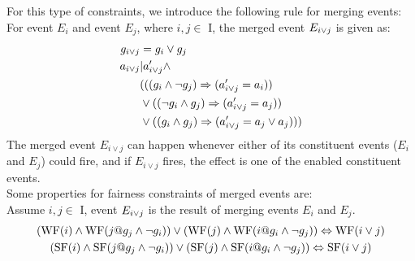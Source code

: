For this type of constraints, we introduce the following rule for
merging events: For event $E_{i}$ and event $E_{j}$, where $i,j \in$
I, the merged event $E_{i\vee j}$ is given as:
\begin{align*}
g_{i\vee {j}} & =  g_i\vee g_j\\
a_{i\vee {j}} & |  a'_{i\vee j} \wedge \\
           &    (((g_i\wedge\neg g_j)\Rightarrow (a'_{i\vee j} = a_i))\\
           &    \vee ((\neg g_i\wedge g_j)\Rightarrow (a'_{i\vee j} = a_j))\\
           &    \vee ((g_i\wedge g_j)\Rightarrow (a'_{i\vee j} = a_j\vee a_j)))
\end{align*}
The merged event $E_{i\lor{j}}$ can happen whenever either of its constituent events ($E_i$ and $E_j$) could fire, and if $E_{i\lor{j}}$ fires, the effect is one of the enabled constituent events.\\
Some properties for fairness constraints of merged events are:\\
Assume $i,j \in$ I, event $E_{i\vee j}$ is the result of merging events $E_i$ and $E_j$.
\begin{gather*} 
  (\mathrm{WF}(i)\wedge\mathrm{WF}(j@g_{j}\wedge\neg{g}_{i}))\vee(\mathrm{WF}(j)\wedge\mathrm{WF}(i@g_{i}\wedge\neg{g}_{j})) \Leftrightarrow\mathrm{WF}(i\vee{j})\\
  (\mathrm{SF}(i)\wedge\mathrm{SF}(j@g_{j}\wedge\neg{g}_{i}))\vee(\mathrm{SF}(j)\wedge\mathrm{SF}(i@g_{i}\wedge\neg{g}_{j})) \Leftrightarrow\mathrm{SF}(i\vee{j})
\end{gather*}

